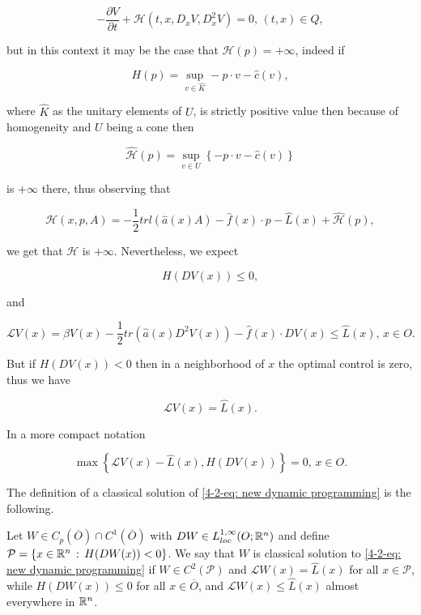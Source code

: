 \[-\frac{\partial V}{\partial t} + \mathcal{H}(t,x,D_x V,D_x^2 V)=0,\,(t,x)\in Q,\]

but in this context it may be the case that $\mathcal{H}(p)=+\infty$, indeed if 

\begin{equation}
    H(p) = \sup_{v\in\hat{K}}-p\cdot v-\hat{c}(v),
\end{equation}

where $\hat{K}$ as the unitary elements of $U$, is strictly positive value then because of homogeneity and $U$ being a cone then

\begin{equation}
    \hat{\mathcal{H}}(p)=\sup_{v\in U}\left\{-p\cdot v - \hat{c}(v)\right\}
\end{equation}

is $+\infty$ there, thus observing that

\[\mathcal{H}(x,p,A) = -\frac{1}{2}trl\left(\hat{a}(x)A\right) - \hat{f}(x)\cdot p - \hat{L}(x) + \hat{\mathcal{H}}(p),\]

we get that $\mathcal{H}$ is $+\infty$. Nevertheless, we expect

\begin{equation}
    H(DV(x)) \leq 0,
\end{equation}

and 

\begin{equation}
    \mathcal{L}V(x) = \beta V(x) - \frac{1}{2}tr\left(\hat{a}(x)D^2V(x)\right) - \hat{f}(x)\cdot DV(x)\leq \hat{L}(x), \, x\in O.
\end{equation}

But if $H(DV(x))<0$ then in a neighborhood of $x$ the optimal control is zero, thus we have

\[\mathcal{L}V(x)=\hat{L}(x).\]

In a more compact notation

\begin{equation}\label{4-2-eq: new dynamic programming}
    \max\left\{\mathcal{L}V(x)-\hat{L}(x),H(DV(x))\right\} = 0,\, x\in O.
\end{equation}

The definition of a classical solution of \eqref{4-2-eq: new dynamic programming} is the following.

\begin{definition}
    Let $W\in C_p(\overline{O})\cap C^1(\overline{O})$ with $DW\in L_{loc}^{1,\infty}(O;\mathbb{R}^n)$ and define $\mathcal{P}=\left\{x\in\mathbb{R}^n\,:\,H(DW(x))<0\right\}$. We say that $W$ is classical solution to \eqref{4-2-eq: new dynamic programming} if $W\in C^2(\mathcal{P})$ and $\mathcal{L}W(x)=\hat{L}(x)$ for all $x\in\mathcal{P}$, while $H(DW(x))\leq 0$ for all $x\in\overline{O}$, and $\mathcal{L}W(x)\leq \hat{L}(x)$ almost everywhere in $\mathbb{R}^n$.  
\end{definition}


